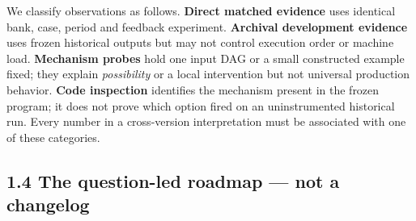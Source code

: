 We classify observations as follows. \textbf{Direct matched evidence} uses identical bank, case, period and feedback experiment. \textbf{Archival development evidence} uses frozen historical outputs but may not control execution order or machine load. \textbf{Mechanism probes} hold one input DAG or a small constructed example fixed; they explain \emph{possibility} or a local intervention but not universal production behavior. \textbf{Code inspection} identifies the mechanism present in the frozen program; it does not prove which option fired on an uninstrumented historical run. Every number in a cross-version interpretation must be associated with one of these categories.

\subsection{1.4 The question-led roadmap --- not a changelog}\label{the-question-led-roadmap-not-a-changelog}


